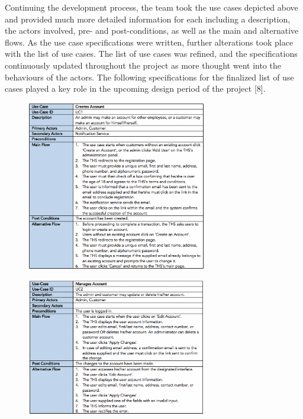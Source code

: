 Continuing the development process, the team took the use cases depicted
above and provided much more detailed information for each including a
description, the actors involved, pre- and post-conditions, as well as
the main and alternative flows. As the use case specifications were
written, further alterations took place with the list of use cases. The
list of use cases was refined, and the specifications continuously
updated throughout the project as more thought went into the behaviours
of the actors. The following specifications for the finalized list of
use cases played a key role in the upcoming design period of the project
{[}8{]}.

\begin{figure}[H]
      \centering
      \includegraphics[trim = 0 0 0 0, clip, width=0.7\textwidth]{TempImg/UC1.png}
 \end{figure}

\begin{figure}[H]
      \centering
      \includegraphics[trim = 0 0 0 0, clip, width=0.7\textwidth]{TempImg/UC2.png}
 \end{figure}

